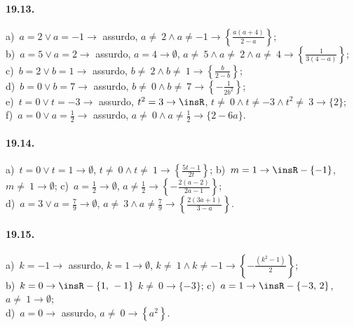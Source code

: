 \paragraph{19.13.}
a)~$a=2\vee a=-1 \rightarrow$ assurdo, $a\neq~2\wedge a\neq -1 \rightarrow \left\{\frac{a(a+4)}{2-a}\right\}$;
\protect\\ b)~$a=5\vee a=2 \rightarrow$ assurdo, $a=4 \rightarrow \emptyset$, $a\neq~5\wedge a\neq~2\wedge a\neq~4 \rightarrow \left\{\frac{1}{3(4-a)}\right\}$;
\protect\\ c)~$b=2\vee b=1 \rightarrow$ assurdo, $b\neq~2\wedge b\neq~1 \rightarrow \left\{\frac{b}{2-b}\right\}$;
\protect\\ d)~$b=0\vee b=7\rightarrow$ assurdo, $b\neq~0\wedge b\neq~7 \rightarrow \left\{-{\frac{1}{2b^{2}}}\right\}$;
\protect\\ e)~$t=0\vee t=-3 \rightarrow$ assurdo, $t^{2}=3 \rightarrow \insR$, $t\neq~0\wedge t\neq -3\wedge t^{2}\neq~3 \rightarrow \{2\}$;
\protect\\ f)~$a=0\vee a=\frac{1}{2} \rightarrow$ assurdo, $a\neq~0\wedge a\neq \frac{1}{2} \rightarrow \{2-6a\}$.

\paragraph{19.14.}
a)~$t=0\vee t=1 \rightarrow \emptyset$, $t\neq~0\wedge t\neq~1 \rightarrow \left\{\frac{5t-1}{2t}\right\}$;
\quad b)~$m=1 \rightarrow \insR-\{-1\}$, $m\neq~1 \rightarrow \emptyset$;
\quad c)~$a=\frac{1}{2} \rightarrow \emptyset$, $a\neq \frac{1}{2} \rightarrow \left\{-{\frac{2(a-2)}{2a-1}}\right\}$;
\protect\\ d)~$a=3\vee a=\frac{7}{9} \rightarrow \emptyset$, $a\neq~3\wedge a\neq \frac{7}{9} \rightarrow \left\{\frac{2(3a+1)}{3-a}\right\}$.

\paragraph{19.15.}
a)~$k=-1 \rightarrow$ assurdo, $k=1 \rightarrow \emptyset$, $k\neq~1\wedge k\neq -1 \rightarrow \left\{-{\frac{\left(k^2-1\right)}{2}}\right\}$;
\protect\\ b)~$k=0 \rightarrow \insR-\{1\text{,~}-1\}$ $k\neq~0 \rightarrow \{-3\}$; c)~$a=1 \rightarrow \insR-\{-3\text{,~}2\}$, $a\neq~1 \rightarrow \emptyset$;
\protect\\ d)~$a=0 \rightarrow$ assurdo, $a\neq~0 \rightarrow \left\{a^{2}\right\}$.

